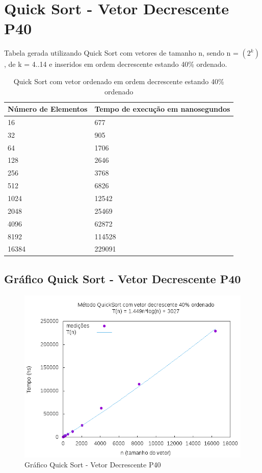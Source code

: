 \documentclass[12pt,a4paper,twoside]{report}
\begin{document}
\section{Quick Sort - Vetor Decrescente P40}
Tabela gerada utilizando Quick Sort com vetores de tamanho n, sendo n = $(2^k)$, de k = 4..14 e inseridos em ordem decrescente estando 40\% ordenado.
\begin{table}[H]
\centering
\caption{Quick Sort com vetor ordenado em ordem decrescente estando 40\% ordenado}
\label{my-label}
\begin{tabular}{|l|l|}
\hline
\multicolumn{1}{|c|}{\textbf{Número de Elementos}} & \multicolumn{1}{c|}{\textbf{Tempo de execução em nanosegundos}} \\ \hline
16 & 677 \\ \hline
32 & 905 \\ \hline
64 & 1706 \\ \hline
128 & 2646 \\ \hline
256 & 3768 \\ \hline
512 & 6826 \\ \hline
1024 & 12542 \\ \hline
2048 & 25469 \\ \hline
4096 & 62872 \\ \hline
8192 & 114528 \\ \hline
16384 & 229091 \\ \hline
\end{tabular}
\end{table}

\subsection{Gráfico Quick Sort - Vetor Decrescente P40}
\begin{figure}[H]
    \centering
    \includegraphics[width=0.7\linewidth]{graficos/QuickSort/vIntDecrescenteP40/vIntDecrescenteP40.png}
  \caption{Gráfico Quick Sort - Vetor Decrescente P40}
\end{figure}
\end{document}
